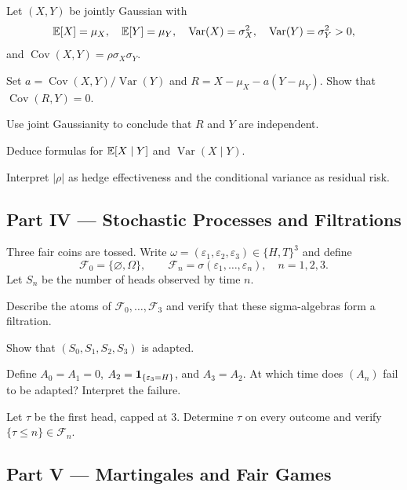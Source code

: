 \begin{exercise}
Let $(X,Y)$ be jointly Gaussian with
\[
\mathbb{E}[X]=\mu_X,\quad \mathbb{E}[Y]=\mu_Y,\quad
\operatorname{Var}(X)=\sigma_X^2,\quad
\operatorname{Var}(Y)=\sigma_Y^2>0,
\]
and $\operatorname{Cov}(X,Y)=\rho\sigma_X\sigma_Y$.
\begin{exparts}
  \item Set $a=\operatorname{Cov}(X,Y)/\operatorname{Var}(Y)$ and
  $R=X-\mu_X-a(Y-\mu_Y)$. Show that $\operatorname{Cov}(R,Y)=0$.
  \item Use joint Gaussianity to conclude that $R$ and $Y$ are independent.
  \item Deduce formulas for $\mathbb{E}[X\mid Y]$ and $\operatorname{Var}(X\mid Y)$.
  \item Interpret $|\rho|$ as hedge effectiveness and the conditional
  variance as residual risk.
\end{exparts}
\end{exercise}

\subsection*{Part IV --- Stochastic Processes and Filtrations}

\begin{exercise}
Three fair coins are tossed. Write
$\omega=(\varepsilon_1,\varepsilon_2,\varepsilon_3)\in\{H,T\}^3$ and define
\[
\mathcal F_0=\{\varnothing,\Omega\},\qquad
\mathcal F_n=\sigma(\varepsilon_1,\ldots,\varepsilon_n),\quad n=1,2,3.
\]
Let $S_n$ be the number of heads observed by time $n$.
\begin{exparts}
  \item Describe the atoms of $\mathcal F_0,\ldots,\mathcal F_3$ and verify
  that these sigma-algebras form a filtration.
  \item Show that $(S_0,S_1,S_2,S_3)$ is adapted.
  \item Define $A_0=A_1=0$, $A_2=\mathbf{1}_{\{\varepsilon_3=H\}}$, and $A_3=A_2$.
  At which time does $(A_n)$ fail to be adapted? Interpret the failure.
  \item Let $\tau$ be the first head, capped at $3$. Determine $\tau$ on every
  outcome and verify $\{\tau\leq n\}\in\mathcal F_n$.
\end{exparts}
\end{exercise}

\subsection*{Part V --- Martingales and Fair Games}

